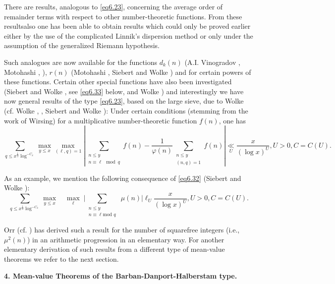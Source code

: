 There are results, analogous to \eqref{eq6.23}, concerning the average order
of remainder terms with respect to other number-theoretic
functions. From these results\pageoriginale also one has been able to
obtain results 
which could only be proved earlier either by the use of the
complicated Linnik's dispersion method or only under the assumption of
the generalized Riemann hypothesis. 

Such analogues are now available for the functions $d_k(n)$
(A.I. Vinogradov \cite{key1}, Motohashi \cite{key1}, \cite{key7}),
$r(n)$ (Motohashi \cite{key2}, Siebert and Wolke \cite{key1}) and for
certain powers of these 
functions. Certain other special functions have also been investigated
(Siebert and Wolke \cite{key1}, see \eqref{eq6.33} below, and Wolke
\cite{key7}) and
interestingly we have now general results of the type \eqref{eq6.23}, based
on the large sieve, due to Wolke (cf. Wolke \cite{key5}, \cite{key6},
Siebert and 
Wolke \cite{key1}): Under certain conditions (stemming from the work of
Wirsing) for a multiplicative number-theoretic function $f(n)$, one
has 
{\fontsize{9pt}{11pt}\selectfont
\begin{equation*}
  \sum_{q\leq x^{\frac{1}{2}}\log^{-C_x}} \underset{y \leq x}{\max}
\underset{(\ell ,q)=1}{\max} | \sum_{\substack{n\leq y\\ n \equiv \ell
    \mod q}} f(n) - \frac{1}{\varphi (n)}\sum_{\substack{n\leq y
    \\ (n,q) =1}} f(n) | \underset{U}{\ll} \frac{x}{(\log x)^U}, U >
0, C = C(U). \tag{6.32}\label{eq6.32}  
\end{equation*}}\relax

As an example, we mention the following consequence of \eqref{eq6.32}
(Siebert and Wolke \cite{key1}): 
\begin{equation*}
\sum_{q\leq x^{\frac{1}{2}}\log^{-C_x}} \underset{y\leq x}{\max} \quad
\underset{\ell}{\max} \; \Big| \sum_{\substack{n\leq y\\n \equiv\ell \text{
      mod } q}} \; \mu (n) \Big| {\ell}_{{}U} \frac{x}{(\log
  x)^U}, U > 0, C=C(U). \tag{6.33}\label{eq6.33} 
\end{equation*}

Orr \cite{key1} (cf. \cite{key2}) has derived such a result for the
number of squarefree integers (i.e., $\mu^2(n)$) in an arithmetic
progression in an elementary way. For another elementary derivation of
such results from a different type of mean-value theorems we refer to
the next section. 

\medskip
\noindent
{\bf 4. Mean-value Theorems of the Barban-Danport-Halberstam type.}
\smallskip


